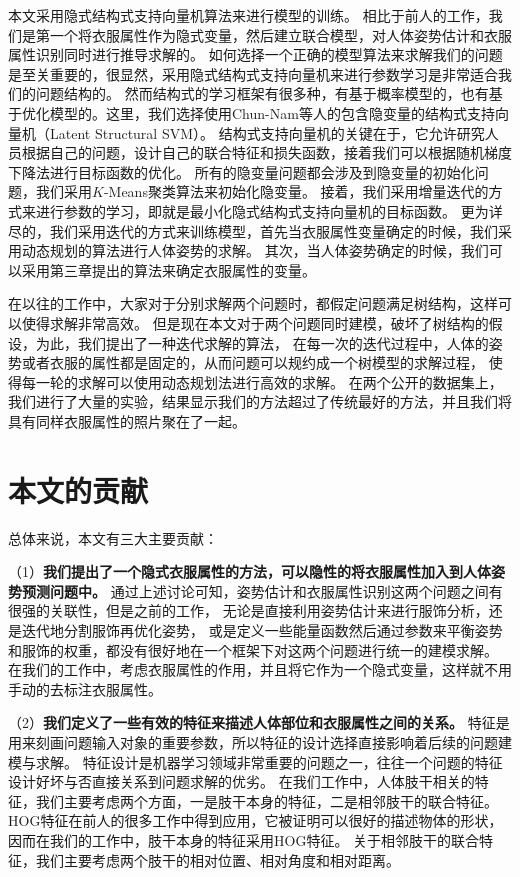 本文采用隐式结构式支持向量机算法来进行模型的训练。
相比于前人的工作，我们是第一个将衣服属性作为隐式变量，然后建立联合模型，对人体姿势估计和衣服属性识别同时进行推导求解的。 如何选择一个正确的模型算法来求解我们的问题是至关重要的，很显然，采用隐式结构式支持向量机来进行参数学习是非常适合我们的问题结构的。 然而结构式的学习框架有很多种，有基于概率模型的，也有基于优化模型的。这里，我们选择使用Chun-Nam等人的包含隐变量的结构式支持向量机（Latent Structural SVM）。 结构式支持向量机的关键在于，它允许研究人员根据自己的问题，设计自己的联合特征和损失函数，接着我们可以根据随机梯度下降法进行目标函数的优化。
所有的隐变量问题都会涉及到隐变量的初始化问题，我们采用$K$-Means聚类算法来初始化隐变量。
接着，我们采用增量迭代的方式来进行参数的学习，即就是最小化隐式结构式支持向量机的目标函数。
更为详尽的，我们采用迭代的方式来训练模型，首先当衣服属性变量确定的时候，我们采用动态规划的算法进行人体姿势的求解。
其次，当人体姿势确定的时候，我们可以采用第三章提出的算法来确定衣服属性的变量。

在以往的工作中，大家对于分别求解两个问题时，都假定问题满足树结构，这样可以使得求解非常高效。 但是现在本文对于两个问题同时建模，破坏了树结构的假设，为此，我们提出了一种迭代求解的算法， 在每一次的迭代过程中，人体的姿势或者衣服的属性都是固定的，从而问题可以规约成一个树模型的求解过程， 使得每一轮的求解可以使用动态规划法进行高效的求解。
在两个公开的数据集上，我们进行了大量的实验，结果显示我们的方法超过了传统最好的方法，并且我们将具有同样衣服属性的照片聚在了一起。

\section{本文的贡献}
总体来说，本文有三大主要贡献：

（1）\textbf{我们提出了一个隐式衣服属性的方法，可以隐性的将衣服属性加入到人体姿势预测问题中。}
通过上述讨论可知，姿势估计和衣服属性识别这两个问题之间有很强的关联性，但是之前的工作，
无论是直接利用姿势估计来进行服饰分析，还是迭代地分割服饰再优化姿势，
或是定义一些能量函数然后通过参数来平衡姿势和服饰的权重，都没有很好地在一个框架下对这两个问题进行统一的建模求解。
在我们的工作中，考虑衣服属性的作用，并且将它作为一个隐式变量，这样就不用手动的去标注衣服属性。

（2）\textbf{我们定义了一些有效的特征来描述人体部位和衣服属性之间的关系。}
特征是用来刻画问题输入对象的重要参数，所以特征的设计选择直接影响着后续的问题建模与求解。 特征设计是机器学习领域非常重要的问题之一，往往一个问题的特征设计好坏与否直接关系到问题求解的优劣。
在我们工作中，人体肢干相关的特征，我们主要考虑两个方面，一是肢干本身的特征，二是相邻肢干的联合特征。 HOG特征在前人的很多工作中得到应用，它被证明可以很好的描述物体的形状，因而在我们的工作中，肢干本身的特征采用HOG特征。 关于相邻肢干的联合特征，我们主要考虑两个肢干的相对位置、相对角度和相对距离。


